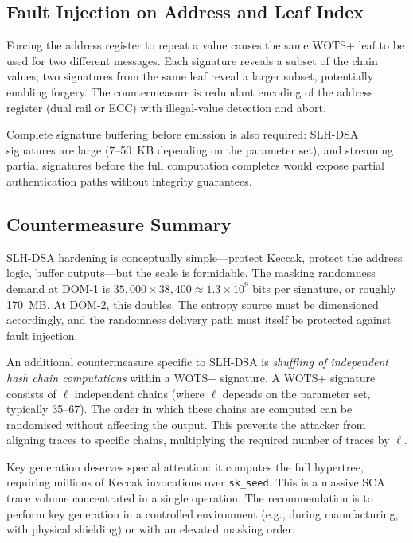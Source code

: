 \subsection{Fault Injection on Address and Leaf Index}
\label{subsec:slhdsa-fi}

Forcing the address register to repeat a value causes the same WOTS+ leaf to be used for two different messages.  Each signature reveals a subset of the chain values; two signatures from the same leaf reveal a larger subset, potentially enabling forgery.  The countermeasure is redundant encoding of the address register (dual rail or ECC) with illegal-value detection and abort.

Complete signature buffering before emission is also required: SLH-DSA signatures are large (7--50~KB depending on the parameter set), and streaming partial signatures before the full computation completes would expose partial authentication paths without integrity guarantees.

\subsection{Countermeasure Summary}
\label{subsec:slhdsa-countermeasures}

SLH-DSA hardening is conceptually simple---protect Keccak, protect the address logic, buffer outputs---but the scale is formidable.  The masking randomness demand at DOM-1 is $35{,}000 \times 38{,}400 \approx 1.3 \times 10^9$ bits per signature, or roughly 170~MB.  At DOM-2, this doubles.  The entropy source must be dimensioned accordingly, and the randomness delivery path must itself be protected against fault injection.

An additional countermeasure specific to SLH-DSA is \emph{shuffling of independent hash chain computations} within a WOTS+ signature.  A WOTS+ signature consists of $\ell$ independent chains (where $\ell$ depends on the parameter set, typically 35--67).  The order in which these chains are computed can be randomised without affecting the output.  This prevents the attacker from aligning traces to specific chains, multiplying the required number of traces by $\ell$.

Key generation deserves special attention: it computes the full hypertree, requiring millions of Keccak invocations over \texttt{sk\_seed}.  This is a massive SCA trace volume concentrated in a single operation.  The recommendation is to perform key generation in a controlled environment (e.g., during manufacturing, with physical shielding) or with an elevated masking order.

